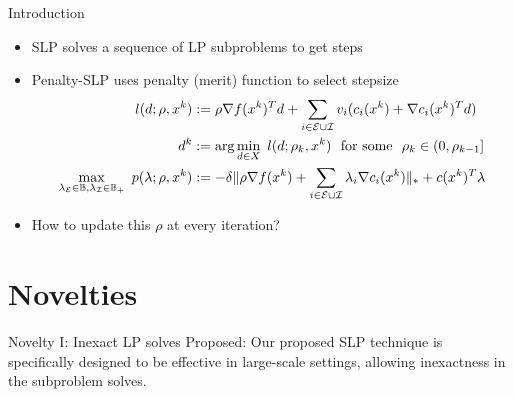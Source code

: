 \documentclass[8pt]{beamer}
\begin{document}
	\begin{frame}[c]{Introduction}
		\vfill
		\begin{itemize}
			\item SLP solves a sequence of LP subproblems to get steps
			\item Penalty-SLP uses penalty (merit) function to select stepsize
			\begin{equation}
		\begin{aligned} 
		l(d; \rho, x^k) & := \rho \nabla f(x^k)^Td + \sum_{i\in{\cal E}\cup{\cal I}} v_i( c_i(x^k) + \nabla c_i(x^k)^Td)\\
					d^k & := \arg\min_{d \in X}\ l(d; \rho_k, x^k)\ \ \text{for some}\ \ \rho_k \in (0,\rho_{k-1}] \\
					\max_{\lambda_{{\cal E}} \in \mathbb{B}, \lambda_{{\cal I}}\in\mathbb{B}_+}\ p(\lambda; \rho, x^k) & :=  -  \delta    \|\rho \nabla f(x^k)+\sum_{i\in{\cal E}\cup{\cal I}}\lambda_i \nabla c_i(x^k) \|_* + c(x^k)^T\lambda
		\end{aligned}
		\end{equation}
		\item How to update this $\rho$ at every iteration? 
		\end{itemize}
	\end{frame}



\section[Novelties]{Novelties}

	\begin{frame}[c]{Novelty I: Inexact LP solves}
		\vfill
		{\red  \leftpointright Proposed: } 
		Our proposed SLP technique is specifically designed to be effective in large-scale settings, allowing {\red inexactness} in the subproblem solves. 
		\vfill
	\end{frame}
\end{document}
